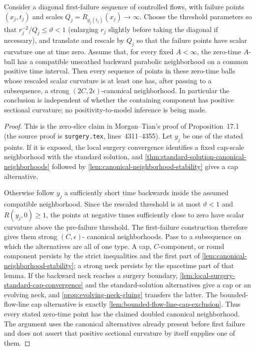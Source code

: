 \begin{lemma}
\label{lem:first-failure-zero-slice-canonical-transfer}
\notready
Consider a diagonal first-failure sequence of controlled flows, with failure
points $(x_j,t_j)$ and scales
$Q_j=R_{g_j(t_j)}(x_j)\to\infty$.  Choose the threshold parameters so that
$r_j^{-2}/Q_j\le\vartheta<1$ (enlarging $r_j$ slightly before taking the
diagonal if necessary), and translate and rescale by $Q_j$ so that the
failure points have scalar curvature one at time zero.  Assume that, for every
fixed $A<\infty$, the zero-time $A$-ball has a compatible unscathed backward
parabolic neighborhood on a common positive time interval.  Then every
sequence of points in these zero-time balls whose rescaled scalar curvature is
at least one has, after passing to a subsequence, a strong
$(2C,2\epsilon)$-canonical neighborhood.  In particular the conclusion is
independent of whether the containing component has positive sectional
curvature; no positivity-to-model inference is being made.
\end{lemma}

\begin{proof}
This is the zero-slice claim in Morgan--Tian's proof of Proposition~17.1
(the source proof is \texttt{surgery.tex}, lines~4311--4355).  Let $y_j$ be
one of the stated points.  If it is exposed, the local surgery convergence
identifies a fixed cap-scale neighborhood with the standard solution, and
\ref{thm:standard-solution-canonical-neighborhoods} followed by
\ref{lem:canonical-neighborhood-stability} gives a cap alternative.

Otherwise follow $y_j$ a sufficiently short time backwards inside the assumed
compatible neighborhood.  Since the rescaled threshold is at most
$\vartheta<1$ and $R(y_j,0)\ge1$, the points at negative times sufficiently
close to zero have scalar curvature above the pre-failure threshold.  The
first-failure construction therefore gives them strong $(C,\epsilon)$-
canonical neighborhoods.  Pass to a subsequence on which the alternatives
are all of one type.  A cap, $C$-component, or round component persists by the
strict inequalities and the first part of
\ref{lem:canonical-neighborhood-stability}; a strong neck persists by the
spacetime part of that lemma.  If the backward neck reaches a surgery boundary,
\ref{lem:local-surgery-standard-cap-convergence} and the standard-solution
alternatives give a cap or an evolving neck, and
\ref{prop:evolving-neck-gluing} transfers the latter.  The bounded-flow-line
cap alternative is exactly \ref{lem:bounded-flow-line-cap-exclusion}.
Thus every stated zero-time point has the claimed doubled canonical
neighborhood.  The argument uses the canonical alternatives already present
before first failure and does not assert that positive sectional curvature by
itself supplies one of them.
\end{proof}

